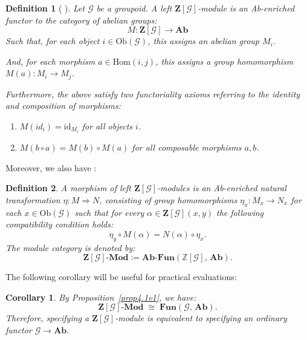 \documentclass[a4paper,12pt]{article}
\newtheorem{definition}{Definition}[section]
\newtheorem{corollary}{Corollary}[section]
\newcommand{\Z}{\mathbb{Z}}
\newcommand{\Zb}{\mathbf{Z}}
\newcommand{\calG}{\mathcal{G}}
\newcommand{\Ab}{\mathbf{Ab}}
\newcommand{\Ob}{\mathrm{Ob}}
\newcommand{\Hom}{\mathrm{Hom}}
\newcommand{\Fun}{\mathbf{Fun}}
\newcommand{\AbFun}{\mathbf{Ab\text{-}Fun}}
\begin{document}
\begin{definition}[ \cite{Mitchell1972, mitchell1985} ] 
\label{defZbmod}  
Let $\calG$ be a groupoid. A \emph{left $\Zb[\calG]$-module} is an
Ab-enriched functor to the category of abelian groups: 
\[
  M : \Zb[\calG] \longrightarrow \Ab  
\]
Such that, for each object $i \in \Ob(\calG)$, this assigns an abelian group $M_i$. 

And, for each morphism $a \in \Hom(i,j)$, this assigns a group homomorphism $M(a) : M_i \to M_j$. 

Furthermore, the above satisfy two functoriality axioms referring to the identity and composition of morphisms:  
\begin{enumerate}
    \item  $M(id_i) = \mathrm{id}_{M_i}$ for all objects $i$.
    \item  $M(b \circ a) = M(b) \circ M(a)$ for all composable morphisms $a, b$.
\end{enumerate}
\end{definition}

Moreover, we also have \cite{Kelly1982, mitchell1985}:   
\begin{definition} 
A \emph{morphism of left $\Zb[\calG]$-modules} is an Ab-enriched natural transformation
$\eta : M \Rightarrow N$, consisting of group homomorphisms
$\eta_x : M_x \to N_x$ for each $x \in \Ob(\calG)$ such that for
every $\alpha \in \Zb[\calG](x,y)$ the following compatibility condition holds: 
\[
  \eta_y \circ M(\alpha) = N(\alpha) \circ \eta_x.
\]
The module category is denoted by:  
\[
   \Zb[\calG]\textbf{-Mod}  := \AbFun(\Z[\calG],\, \Ab).
\]
\end{definition}


The following corollary will be useful for practical evaluations: 
\begin{corollary}  
By Proposition~\ref{prop4.1v1}, we have:  
\[
  \Zb[\calG]\textbf{-Mod}  \;\cong\; \Fun(\calG,\, \Ab).
\]
Therefore, specifying a $\Zb[\calG]$-module is equivalent to specifying an
ordinary functor $\calG \to \Ab$.
\end{corollary}
\end{document}
